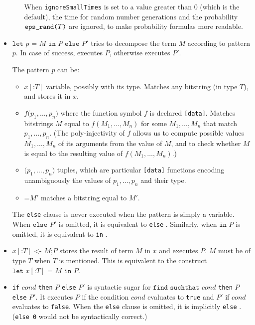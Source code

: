 \begin{itemize}
\begin{itemize}
When \texttt{ignoreSmallTimes} is set to a value greater than 0
(which is the default),
the time for random number generations and the probability
$\texttt{eps\_rand(}T\texttt{)}$ are ignored, to make probability formulas 
more readable.

\end{itemize}

\item $\texttt{let }p \texttt{ = }M\texttt{ in }P\texttt{ else }P'$
tries to decompose the term $M$ according to pattern $p$.
In case of success, executes $P$, otherwise executes $P'$.

The pattern $p$ can be:
\begin{itemize}

\item $x[\texttt{:}T]$ variable, possibly with its type. Matches any bitstring
(in type $T$), and stores it in $x$.

\item $f\texttt{(}p_1, \ldots, p_n\texttt{)}$ 
where the function symbol $f$ is declared 
\texttt{[data]}. Matches bitstrings $M$ equal to $f(M_1, \ldots, M_n)$
for some $M_1, \ldots, M_n$ that match $p_1, \ldots, p_n$.
(The poly-injectivity of $f$ allows us to compute possible
values $M_1, \ldots, M_n$ of its arguments from the value of $M$, and to check
whether $M$ is equal to the resulting value of $f(M_1, \ldots, M_n)$.) 

\item $\texttt{(}p_1, \ldots, p_n\texttt{)}$ tuples, which are particular \texttt{[data]}
functions encoding unambiguously the values of $p_1, \ldots, p_n$
and their type.

\item $\texttt{=}M'$ matches a bitstring equal to $M'$.

\end{itemize}
The \texttt{else} clause is never executed when the pattern
is simply a variable.
When $\texttt{else }P'$ is omitted, it is equivalent to \texttt{else} \yield.
Similarly, when $\texttt{in }P$ is omitted, it is equivalent to 
\texttt{in} \yield.

\item $x[\texttt{:}T] \texttt{ <- }M\texttt{;}P$
stores the result of term $M$ in $x$ and executes $P$.
$M$ must be of type $T$ when $T$ is mentioned.
This is equivalent to the construct $\texttt{let } x[\texttt{:}T] 
\texttt{ = }M\texttt{ in }P$.

\item \texttt{if} $\mathit{cond}$ \texttt{then} $P$ \texttt{else} $P'$ is 
syntactic sugar for $\texttt{find suchthat }\mathit{cond}$ \texttt{then} $P$ \texttt{else} $P'$.
It executes $P$ if the condition $\mathit{cond}$ evaluates to \texttt{true} and $P'$ if $\mathit{cond}$ evaluates to \texttt{false}.
When the \texttt{else} clause is omitted, it is implicitly \texttt{else} \yield.
(\texttt{else 0} would not be syntactically correct.) 


\end{itemize}
